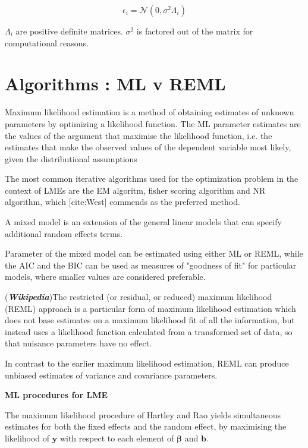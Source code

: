\documentclass[MAIN.tex]{subfiles}
\begin{document}
\begin{equation}
\epsilon_{i} = \mathcal{N}(0, \sigma^2 \Lambda_{i})
\end{equation}

$\Lambda_{i}$ are positive definite matrices. $\sigma^2$ is factored out of the matrix for computational reasons.


\section{Algorithms : ML v REML}
Maximum likelihood estimation is a method of obtaining estimates of unknown parameters by optimizing a likelihood function. The ML
parameter estimates are the values of the argument that maximise the likelihood function, i.e. the estimates that make the observed
values of the dependent variable most likely, given the distributional assumptions

The most common iterative algorithms used for the optimization
problem in the context of LMEs are the EM algoritm, fisher scoring
algorithm and NR algorithm, which [cite:West] commends as the
preferred method.

A mixed model is an extension of the general linear models that
can specify additional random effects terms.

Parameter of the mixed model can be estimated using either ML or
REML, while the AIC and the BIC can be used as measures of
"goodness of fit" for particular models, where smaller values are
considered preferable.


(\textbf{\emph{Wikipedia}})The restricted (or residual, or reduced) maximum likelihood (REML) approach is a particular form of maximum likelihood estimation which does not base estimates on a maximum likelihood fit of all the information, but instead uses a likelihood function calculated from a transformed set of data, so that nuisance parameters have no effect.

In contrast to the earlier maximum likelihood estimation, REML can produce unbiased estimates of variance and covariance parameters.


\noindent \textbf{ML procedures for LME}

The maximum likelihood procedure of Hartley and Rao yields
simultaneous estimates for both the fixed effects and the random
effect, by maximising the likelihood of $\boldsymbol{y}$ with
respect to each element of $\boldsymbol{\beta}$ and
$\boldsymbol{b}$.
\end{document}
